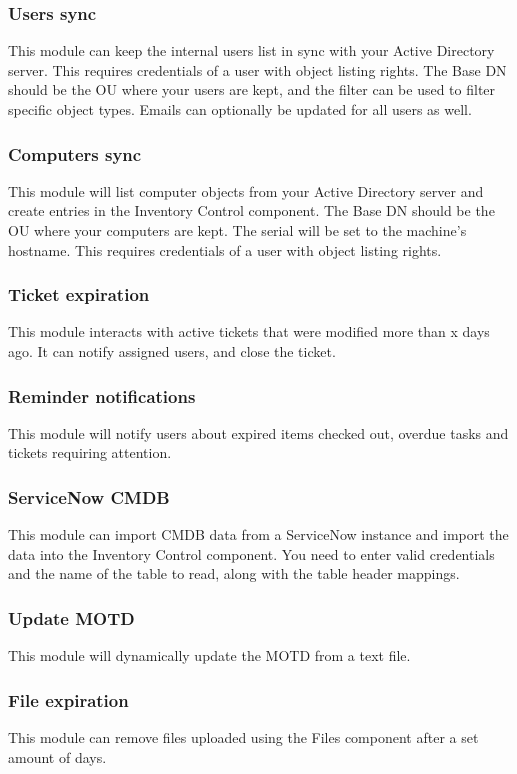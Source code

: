 \documentclass[11pt]{article}
\begin{document}
\subsubsection{Users sync}
This module can keep the internal users list in sync with your Active Directory server. This requires credentials of a user with object listing rights. The Base DN should be the OU where your users are kept, and the filter can be used to filter specific object types. Emails can optionally be updated for all users as well.

\subsubsection{Computers sync}
This module will list computer objects from your Active Directory server and create entries in the Inventory Control component. The Base DN should be the OU where your computers are kept. The serial will be set to the machine's hostname. This requires credentials of a user with object listing rights.

\subsubsection{Ticket expiration}
This module interacts with active tickets that were modified more than x days ago. It can notify assigned users, and close the ticket.

\subsubsection{Reminder notifications}
This module will notify users about expired items checked out, overdue tasks and tickets requiring attention.

\subsubsection{ServiceNow CMDB}
This module can import CMDB data from a ServiceNow instance and import the data into the Inventory Control component. You need to enter valid credentials and the name of the table to read, along with the table header mappings.

\subsubsection{Update MOTD}
This module will dynamically update the MOTD from a text file.

\subsubsection{File expiration}
This module can remove files uploaded using the Files component after a set amount of days.
\end{document}
